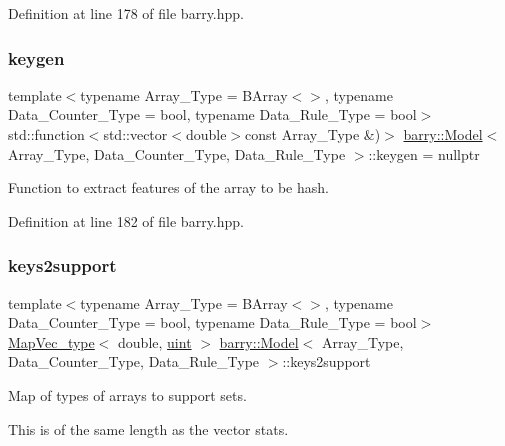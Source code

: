 Definition at line 178 of file barry.\+hpp.

\mbox{\label{classbarry_1_1_model_a68f7422006423a4f0a00c3e4f5d0e1d5}} 
\subsubsection{\texorpdfstring{keygen}{keygen}}
{\footnotesize\ttfamily template$<$typename Array\+\_\+\+Type  = B\+Array$<$$>$, typename Data\+\_\+\+Counter\+\_\+\+Type  = bool, typename Data\+\_\+\+Rule\+\_\+\+Type  = bool$>$ \\
std\+::function$<$std\+::vector$<$double$>$const Array\+\_\+\+Type \&)$>$ \hyperlink{classbarry_1_1_model}{barry\+::\+Model}$<$ Array\+\_\+\+Type, Data\+\_\+\+Counter\+\_\+\+Type, Data\+\_\+\+Rule\+\_\+\+Type $>$\+::keygen = nullptr}



Function to extract features of the array to be hash. 



Definition at line 182 of file barry.\+hpp.

\mbox{\label{classbarry_1_1_model_a802069270d02f2e2ad7e5f2adb51c2bc}} 
\subsubsection{\texorpdfstring{keys2support}{keys2support}}
{\footnotesize\ttfamily template$<$typename Array\+\_\+\+Type  = B\+Array$<$$>$, typename Data\+\_\+\+Counter\+\_\+\+Type  = bool, typename Data\+\_\+\+Rule\+\_\+\+Type  = bool$>$ \\
\hyperlink{namespacebarry_a2f0d3aab1d67e4c8eaeab9022e16139f}{Map\+Vec\+\_\+type}$<$ double, \hyperlink{namespacebarry_a11dfc53ddb4672278319aa04f1e09a6c}{uint} $>$ \hyperlink{classbarry_1_1_model}{barry\+::\+Model}$<$ Array\+\_\+\+Type, Data\+\_\+\+Counter\+\_\+\+Type, Data\+\_\+\+Rule\+\_\+\+Type $>$\+::keys2support}



Map of types of arrays to support sets. 

This is of the same length as the vector {\ttfamily stats}. 


